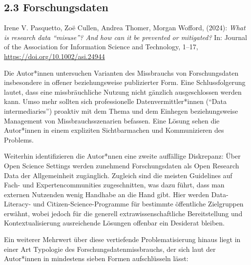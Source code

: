 \documentclass[a4paper,
fontsize=11pt,
oneside,
numbers=noperiodatend,
parskip=half-,
bibliography=totoc,
final
]{scrartcl}
\begin{document}
\hypertarget{forschungsdaten}{%
\subsection{2.3 Forschungsdaten}\label{forschungsdaten}}

Irene V. Pasquetto, Zoë Cullen, Andrea Thomer, Morgan Wofford, (2024):
\emph{What is research data \enquote{misuse}? And how can it be
prevented or mitigated?} In: Journal of the Association for Information
Science and Technology, 1--17, \url{https://doi.org/10.1002/asi.24944}

Die Autor*innen untersuchen Varianten des Missbrauchs von
Forschungsdaten insbesondere in offener beziehungsweise publizierter
Form. Eine Schlussfolgerung lautet, dass eine missbräuchliche Nutzung
nicht gänzlich ausgeschlossen werden kann. Umso mehr sollten sich
professionelle Datenvermittler*innen (\enquote{Data intermediaries})
proaktiv mit dem Thema und dem Einhegen beziehungsweise Management von
Missbrauchsszenarien befassen. Eine Lösung sehen die Autor*innen in
einem expliziten Sichtbarmachen und Kommunizieren des Problems.

Weiterhin identifizieren die Autor*nnen eine zweite auffällige
Diskrepanz: Über Open Science Settings werden zunehmend Forschungsdaten
als Open Research Data der Allgemeinheit zugänglich. Zugleich sind die
meisten Guidelines auf Fach- und Expertencommunities zugeschnitten, was
dazu führt, dass man externen Nutzenden wenig Handhabe an die Hand gibt.
Hier werden Data-Literacy- und Citizen-Science-Programme für bestimmte
öffentliche Zielgruppen erwähnt, wobei jedoch für die generell
extrawissenschaftliche Bereitstellung und Kontextualisierung
ausreichende Lösungen offenbar ein Desiderat bleiben.

Ein weiterer Mehrwert über diese vertiefende Problematisierung hinaus
liegt in einer Art Typologie des Forschungsdatenmissbrauchs, der sich
laut der Autor*innen in mindestens sieben Formen aufschlüsseln lässt:
\end{document}
